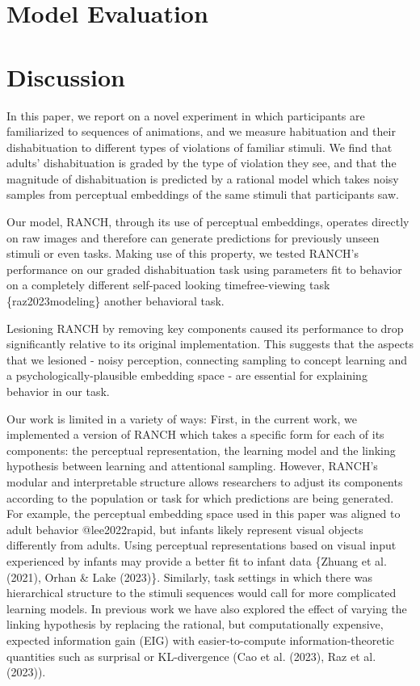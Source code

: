 \documentclass[10pt, letterpaper]{article}
\begin{document}
\hypertarget{model-evaluation}{%
\section{Model Evaluation}\label{model-evaluation}}

\hypertarget{discussion}{%
\section{Discussion}\label{discussion}}

In this paper, we report on a novel experiment in which participants are
familiarized to sequences of animations, and we measure habituation and
their dishabituation to different types of violations of familiar
stimuli. We find that adults' dishabituation is graded by the type of
violation they see, and that the magnitude of dishabituation is
predicted by a rational model which takes noisy samples from perceptual
embeddings of the same stimuli that participants saw.

Our model, RANCH, through its use of perceptual embeddings, operates
directly on raw images and therefore can generate predictions for
previously unseen stimuli or even tasks. Making use of this property, we
tested RANCH's performance on our graded dishabituation task using
parameters fit to behavior on a completely different self-paced looking
timefree-viewing task \{raz2023modeling\} another behavioral task.

Lesioning RANCH by removing key components caused its performance to
drop significantly relative to its original implementation. This
suggests that the aspects that we lesioned - noisy perception,
connecting sampling to concept learning and a psychologically-plausible
embedding space - are essential for explaining behavior in our task.

Our work is limited in a variety of ways: First, in the current work, we
implemented a version of RANCH which takes a specific form for each of
its components: the perceptual representation, the learning model and
the linking hypothesis between learning and attentional sampling.
However, RANCH's modular and interpretable structure allows researchers
to adjust its components according to the population or task for which
predictions are being generated. For example, the perceptual embedding
space used in this paper was aligned to adult behavior @lee2022rapid,
but infants likely represent visual objects differently from adults.
Using perceptual representations based on visual input experienced by
infants may provide a better fit to infant data \{Zhuang et al. (2021),
Orhan \& Lake (2023)\}. Similarly, task settings in which there was
hierarchical structure to the stimuli sequences would call for more
complicated learning models. In previous work we have also explored the
effect of varying the linking hypothesis by replacing the rational, but
computationally expensive, expected information gain (EIG) with
easier-to-compute information-theoretic quantities such as surprisal or
KL-divergence (Cao et al. (2023), Raz et al. (2023)).
\end{document}

